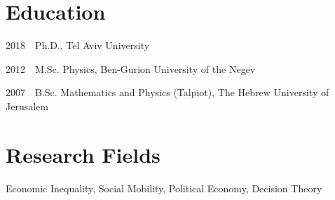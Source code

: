 \documentclass[10pt]{article}
\renewenvironment{itemize}{
  \begin{list}{}{
      \setlength{\leftmargin}{1.0em}
      \setlength{\itemsep}{0.1em}
      \setlength{\parskip}{0pt}
      \setlength{\parsep}{0.2em}
    }
}{
  \end{list}
}
\begin{document}
\section*{Education}

\begin{itemize}
  \item 2018~~Ph.D., Tel Aviv University
  \item 2012~~M.Sc. Physics, Ben-Gurion University of the Negev
  \item 2007~~B.Sc. Mathematics and Physics (Talpiot), The Hebrew University of Jerusalem
\end{itemize}

\section*{Research Fields}
\begin{itemize}
\item Economic Inequality, Social Mobility, Political Economy, Decision Theory
\end{itemize}
\end{document}
